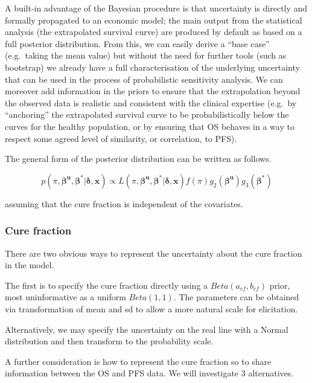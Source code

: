 \documentclass[
]{article}
\begin{document}
A built-in advantage of the Bayesian procedure is that uncertainty is
directly and formally propagated to an economic model; the main output
from the statistical analysis (the extrapolated survival curve) are
produced by default as based on a full posterior distribution. From
this, we can easily derive a ``base case'' (e.g.~taking the mean value)
but without the need for further tools (such as bootstrap) we already
have a full characterisation of the underlying uncertainty that can be
used in the process of probabilistic sensitivity analysis. We can
moreover add information in the priors to ensure that the extrapolation
beyond the observed data is realistic and consistent with the clinical
expertise (e.g.~by ``anchoring'' the extrapolated survival curve to be
probabilistically below the curves for the healthy population, or by
ensuring that OS behaves in a way to respect some agreed level of
similarity, or correlation, to PFS).

The general form of the posterior distribution can be written as
follows.

\[
p(\pi, \boldsymbol{\beta^u}, \boldsymbol{\beta^*} | \boldsymbol{\delta}, \boldsymbol{x}) \propto L(\pi, \boldsymbol{\beta^u}, \boldsymbol{\beta^*} | \boldsymbol{\delta}, \boldsymbol{x}) f(\pi) g_2(\boldsymbol{\beta^u}) g_3(\boldsymbol{\beta^*})
\]

assuming that the cure fraction is independent of the covariates.

\hypertarget{cure-fraction}{%
\subsubsection{Cure fraction}\label{cure-fraction}}

There are two obvious ways to represent the uncertainty about the cure
fraction in the model.

The first is to specify the cure fraction directly using a
\(Beta(a_{cf}, b_{cf})\) prior, most uninformative as a uniform
\(Beta(1,1)\). The parameters can be obtained via transformation of mean
and sd to allow a more natural scale for elicitation.

Alternatively, we may specify the uncertainty on the real line with a
Normal distribution and then transform to the probability scale.

A further consideration is how to represent the cure fraction so to
share information between the OS and PFS data. We will investigate 3
alternatives.
\end{document}
